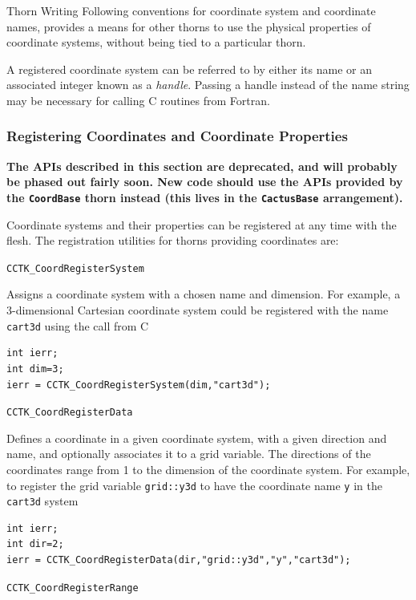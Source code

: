 \begin{cactuspart}{Thorn Writing}
Following conventions for coordinate system and coordinate names,
provides a means for other thorns to use the physical properties of
coordinate systems, without being tied to a particular thorn.

A registered coordinate system can be referred to by either its name or
an associated integer known as a \textit{handle}. Passing a handle instead
of the name string may be necessary for calling C routines from Fortran.


\subsubsection{Registering Coordinates and Coordinate Properties}

\textbf{The APIs described in this section are deprecated, and will
probably be phased out fairly soon.
New code should use the APIs provided by the \texttt{CoordBase} thorn
instead (this lives in the \texttt{CactusBase} arrangement).}

Coordinate systems and their properties can be registered at any time with the flesh.
The registration utilities for thorns providing coordinates are:
\begin{Lentry}

\item[\texttt{CCTK\_CoordRegisterSystem}]

Assigns a coordinate system with a chosen name and dimension. For example,
a 3-dimensional Cartesian coordinate system could be registered with the
name \texttt{cart3d} using the call from C
%
\begin{verbatim}
int ierr;
int dim=3;
ierr = CCTK_CoordRegisterSystem(dim,"cart3d");
\end{verbatim}

\item[\texttt{CCTK\_CoordRegisterData}]

Defines a coordinate in a given coordinate system, with a given
        direction and name, and optionally associates it to a grid variable.
The directions of the coordinates range from 1 to the dimension of the
coordinate system. For example, to register the grid variable \texttt{grid::y3d}
to have the coordinate name \texttt{y} in the \texttt{cart3d} system
%
\begin{verbatim}
int ierr;
int dir=2;
ierr = CCTK_CoordRegisterData(dir,"grid::y3d","y","cart3d");
\end{verbatim}

\item[\texttt{CCTK\_CoordRegisterRange}]


\end{Lentry}
\end{cactuspart}
